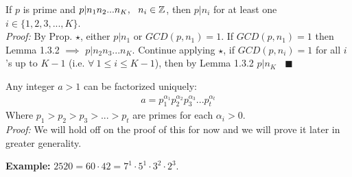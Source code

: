 \setcounter{dummy_lemma}{1}
\begin{corollary}
If $p$ is prime and $p|n_1n_2...n_K,\ \ n_i\in {\mathbb{ Z}}$, then $p|n_i$ for at least one $i \in \{1,2,3,...,K\}$.\\
\textit{Proof:} By Prop. $\star$, either $p|n_1$ or $GCD(p,n_1)=1$. If $GCD(p,n_1)=1$ then Lemma 1.3.2 $\implies$ $p|n_2n_3...n_K$. Continue applying $\star$, if $GCD(p,n_i)=1$ for all $i$'s up to $K-1$ (i.e. $\forall \ 1\leq i\leq K-1$), then by Lemma 1.3.2 $p|n_K\ \ \ \ \blacksquare$
\end{corollary}
\setcounter{dummy}{0}
\begin{theorem} 
Any integer $a>1$ can be factorized uniquely:
\begin{align}
    a=p_1^{\alpha_1}p_2^{\alpha_2}p_3^{\alpha_3}...p_t^{\alpha_t}\nonumber
\end{align}
Where $p_1>p_2>p_3>...>p_t$ are primes for each $\alpha_i>0$.\steezybreak\\
\noindent\textit{Proof:} We will hold off on the proof of this for now and we will prove it later in greater generality.\steezybreak\\
\end{theorem}

\textbf{Example:} $2520=60\cdot 42 = 7^1\cdot 5^1\cdot 3^2 \cdot 2^3$. 
